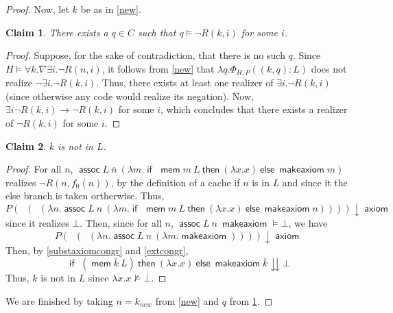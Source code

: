 \documentclass{article}
\newtheorem{claim}{Claim}
\DeclareMathOperator{\makeaxiom}{\mathsf{makeaxiom}}
\DeclareMathOperator{\axiom}{\mathsf{axiom}}
\DeclareMathOperator{\assoc}{\mathsf{assoc}}
\DeclareMathOperator{\mem}{\mathsf{mem}}
\DeclareMathOperator{\iif}{\mathsf{if}\ }
\newcommand{\tthen}{\mathbin{\ \mathsf{then}}\ }
\newcommand{\eelse}{\mathbin{\ \mathsf{else}}\ }
\DeclareMathOperator{\introexists}{\mathsf{intro}_\exists}
\DeclareMathOperator{\introforall}{\mathsf{intro}_\forall}
\DeclareMathOperator{\elimexists}{\mathsf{elim}_\exists}
\begin{document}
\begin{proof}
    Now, let $k$ be as in \cref{new}.
    
    \begin{claim}\label{newrealizer}
        There exists a $q \in C$ such that $q \models \neg R(k, i)$ for some $i$.
    \end{claim}
    \begin{proof}
        Suppose, for the sake of contradiction, that there is no such $q$.
        Since $H \models \forall k. \nabla \exists i. \neg R(n, i)$, it follows from \cref{new} that $\lambda q. \Phi_{H, P} ((k, q):L)$ does not realize $\neg \exists i. \neg R(k, i)$.
        Thus, there exists at least one realizer of $\exists i. \neg R(k, i)$ (since otherwise any code would realize its negation).
        Now, $\exists i \neg R(k, i) \xrightarrow{\elimexists} \neg R(k, i)$ for some $i$, which concludes that there exists a realizer of $\neg R(k, i)$ for some $i$.
    \end{proof}

    \begin{claim}\label{newdifferent}
        $k$ is not in $L$.
    \end{claim}
    \begin{proof}
        For all $n$, $\assoc L\ \overline{n}\ (\lambda m. \iif \mem m\ L \tthen (\lambda x. x) \eelse \makeaxiom m)$ realizes $\neg R(n, f_0(n))$, by the definition of a cache if $n$ is in $L$ and since it the else branch is taken ortherwise.
        Thus, \[P (\introexists (\introforall (\lambda n. \assoc L\ n\ (\lambda m. \iif \mem m\ L \tthen (\lambda x. x) \eelse \makeaxiom n)))) \downarrow \axiom\]
        since it realizes $\bot$.
        Then, since for all $n$, $\assoc L\ n\ \makeaxiom \models \bot$, we have \[P (\introexists (\introforall (\lambda n. \assoc L\ n\ (\lambda m. \makeaxiom)))) \downarrow \axiom\]
        Then, by \cref{substaxiomcongr} and \cref{extcongr},
        \[\iif (\mem \overline{k}\ L) \tthen (\lambda x. x) \eelse \makeaxiom \overline{k} \downdownarrows \bot\]
        Thus, $k$ is not in $L$ since $\lambda x. x \not\models \bot$.
    \end{proof}

    We are finished by taking $n = k_{new}$ from \cref{new} and $q$ from \cref{newrealizer}.
\end{proof}
\end{document}
